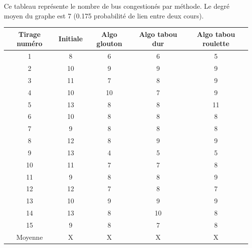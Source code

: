 \documentclass[a4paper,11pt]{article}
\begin{document}
	Ce tableau représente le nombre de bus congestionés par méthode. Le degré moyen du graphe est 7 (0.175 probabilité de lien entre deux cours).\\ 
	\begin{tabular}{|c|c|c|c|c|}
  		\hline
  		Tirage numéro & Initiale & Algo glouton & Algo tabou dur & Algo tabou roulette\\
  		\hline
  		1 & 8 & 6 & 6 & 5\\
  		\hline
  		2 & 10 & 9 & 9 & 9\\
  		\hline
  		3 & 11 & 7 & 8 & 9\\
  		\hline
  		4 & 10 & 10 & 7 & 9\\
  		\hline
  		5 & 13 & 8 & 8 & 11\\
  		\hline
  		6 & 10 & 8 & 8 & 8\\
  		\hline
  		7 & 9 & 8 & 8 & 8\\
  		\hline
  		8 & 12 & 8 & 9 & 9\\
  		\hline
  		9 & 13 & 4 & 5 & 5\\
  		\hline
  		10 & 11 & 7 & 7 & 8\\
  		\hline
  		11 & 9 & 8 & 8 & 9\\
  		\hline
  		12 & 12 & 7 & 8 & 7\\
  		\hline
  		13 & 10 & 9 & 9 & 9\\
  		\hline
  		14 & 13 & 8 & 10 & 8\\
  		\hline
  		15 & 9 & 8 & 7 & 8\\
  		\hline
  		Moyenne & X & X & X & X\\
  		\hline
	\end{tabular}
\end{document}
